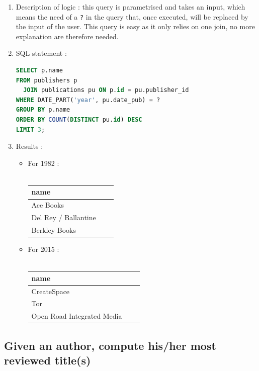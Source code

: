 \documentclass[doubleside, titlepage]{article}
\begin{document}
	\begin{enumerate}
	\item Description of logic : this query is parametrised and takes an input, which means the need of a \texttt{?} in the query that, once executed, will be replaced by the input of the user. This query is easy as it only relies on one join, no more explanation are therefore needed.
	\item SQL statement :
		\begin{lstlisting}[language=SQL,showspaces=false,basicstyle=\ttfamily,numberstyle=\tiny,commentstyle=\color{gray}]
SELECT p.name
FROM publishers p
  JOIN publications pu ON p.id = pu.publisher_id
WHERE DATE_PART('year', pu.date_pub) = ?
GROUP BY p.name
ORDER BY COUNT(DISTINCT pu.id) DESC
LIMIT 3;
		\end{lstlisting}

	\item Results :
	\begin{itemize}
	\item For 1982 :~\\~\\
	\begin{tabular}{|l|c|r|}
	  \hline
		name \\
	  \hline
		Ace Books\\
		Del Rey / Ballantine\\
		Berkley Books\\
	  \hline
	\end{tabular}
	\item For 2015 :~\\~\\
	\begin{tabular}{|l|c|r|}
	  \hline
		name \\
	  \hline
		CreateSpace\\
		Tor\\
		Open Road Integrated Media\\
	  \hline
	\end{tabular}
	\end{itemize}
\end{enumerate}

\subsection{Given an author, compute his/her most reviewed title(s)}
\end{document}
